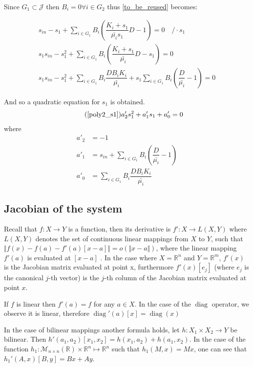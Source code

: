 \documentclass[3p,times]{article}
\newcommand{\R}{\mathbb{R}}
\DeclareMathOperator{\diag}{diag}
\begin{document}
Since $G_1 \subset \mathcal{J} $ then $B_i = 0 \forall i \in G_2$ thus \eqref{to_be_reused} becomes:


\begin{align}
\displaystyle s_{in} - s_1 + \sum \limits_{i \in G_1} B_i \left(\dfrac{K_i+s_1}{\bar{\mu_i}s_1}D - 1 \right) = 0 \quad /\cdot s_1 \\
\displaystyle s_1s_{in} - s_1^2 + \sum \limits_{i \in G_1} B_i \left(\dfrac{K_i+s_1}{\bar{\mu_i}}D - s_1 \right)= 0 \\
\displaystyle s_1s_{in} - s_1^2 + \sum \limits_{i \in G_1} B_i \dfrac{DB_iK_i}{\bar{\mu_i}} + s_1\sum \limits_{i \in G_1}B_i\left(\dfrac{D}{\bar{\mu_i}}-1\right) = 0
\end{align}

And so a quadratic equation for $s_1$ is obtained.
\begin{align}
\tag{\ref{poly2_s1}} a'_2 s_1^2 + a'_1s_1 + a'_0 = 0
\end{align}
where
\begin{align}
a'_2 &= -1 \\
a'_1 &= s_{in} + \sum \limits_{i \in G_1}B_i\left(\dfrac{D}{\bar{\mu_i}}-1\right) \\
a'_0 &=\sum \limits_{i \in G_1} B_i \dfrac{DB_iK_i}{\bar{\mu_i}} 
\end{align}

\subsection{Jacobian of the system}

 Recall that $f:X\rightarrow Y$ is a function, then its derivative is $f':X \rightarrow L(X,Y)$ where $L(X,Y)$ denotes the set of continuous linear mappings from $X$ to $Y$, such that $\Vert f(x)-f(a) -f'(a)[x-a] \Vert = o(\Vert x-a \Vert) $, where the linear mapping $f'(a)$ is evaluated at $[x-a]$ \cite{cartan1971differential}. In the case where $X=\R^n$ and $Y = \R^m$, $f'(x)$ is the Jacobian matrix evaluated at point x, furthermore $f'(x)[e_j]$ (where $e_j$ is the canonical $j$-th vector) is the $j$-th column of the Jacobian matrix evaluated at point $x$. 

If $f$ is linear then $f'(a)= f$ for any $a \in X$. In the case of the $\diag$ operator, we observe it is linear, therefore $\diag'(a)[x]= \diag(x) $

In the case of bilinear mappings another formula holds, let $h: X_1 \times X_2 \rightarrow Y$ be bilinear. Then $h'(a_1,a_2)[x_1,x_2] = h(x_1,a_2) + h(a_1,x_2)$.
In the case of the function $h_1: \mathcal{M}_{n\times n}(\R) \times \R^n \mapsto \R^n$ such that $h_1(M,x) = Mx$, one can see that $h_1'(A,x)[B,y] = Bx + Ay$.
\end{document}
